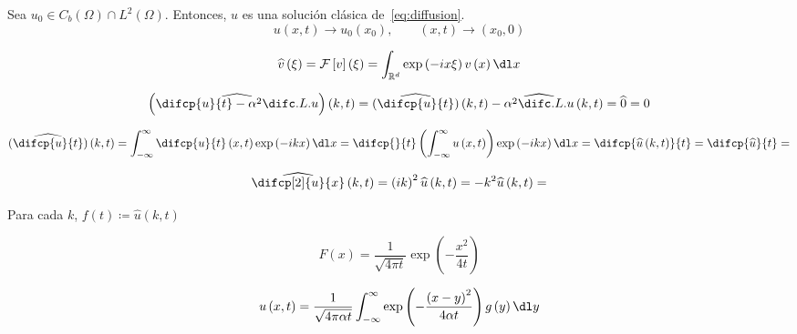 \begin{theorem}[Existencia]
    Sea $u_{0}\in C_{b}\left(\Omega\right)\cap L^{2}\left(\Omega\right)$.
    Entonces, $u$ es una solución clásica de~\eqref{eq:diffusion}.
    \begin{equation*}
        u\left(x,t\right)\to u_{0}\left(x_{0}\right),\qquad
        \left(x,t\right)\to\left(x_{0},0\right)
    \end{equation*}
\end{theorem}

\begin{equation*}
    \widehat{v}\left(\xi\right)=
    \mathcal{F}\left[v\right]\left(\xi\right)=
    \int_{\mathbb{R}^{d}}
    \exp\left(-ix\xi\right)
    v\left(x\right)\dl x
\end{equation*}

\begin{equation*}
    \left(
    \widehat{
        \difcp{u}{t}-
        \alpha^{2}\difc.L.{u}{}
    }
    \right)
    \left(k,t\right)=
    \widehat{\left(\difcp{u}{t}\right)}
    \left(k,t\right)-
    \widehat{\alpha^{2}\difc.L.{u}{}}
    \left(k,t\right)
    =\widehat{0}=
    0
\end{equation*}

\begin{equation*}
    \widehat{\left(\difcp{u}{t}\right)}
    \left(k,t\right)=
    \int_{-\infty}^{\infty}
    \difcp{u}{t}
    \left(x,t\right)
    \exp\left(-ikx\right)
    \dl x=
    \difcp{}{t} %
    \left(
    \int_{-\infty}^{\infty}
    u
    \left(x,t\right)
    \right)
    \exp\left(-ikx\right)
    \dl x=
    \difcp{\widehat{u}\left(k,t\right)}{t}=
    \difcp{\widehat{u}}{t}=
\end{equation*}

\begin{equation*}
    \widehat{\difcp[2]{u}{x}}
    \left(k,t\right)=
    \left(ik\right)^{2}
    \widehat{u}
    \left(k,t\right)=
    -k^{2}
    \widehat{u}
    \left(k,t\right)=
\end{equation*}

Para cada $k$, $f\left(t\right)\coloneqq\widehat{u}\left(k,t\right)$

\begin{equation*}
    F\left(x\right)=
    \dfrac{1}{\sqrt{4\pi t}}
    \exp\left(-\dfrac{x^{2}}{4t}\right)
\end{equation*}

\begin{equation*}
    u\left(x,t\right)=
    \dfrac{1}{\sqrt{4\pi\alpha t}}
    \int_{-\infty}^{\infty}
    \exp\left(-\dfrac{{\left(x-y\right)}^{2}}{4\alpha t}\right)
    g\left(y\right)\dl y
\end{equation*}

